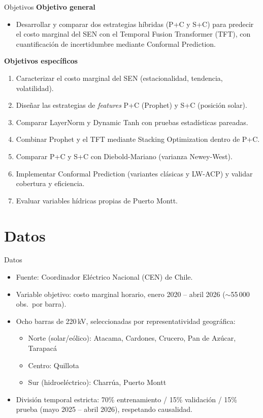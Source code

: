 \documentclass[aspectratio=169]{beamer}
\begin{document}
\begin{frame}{Objetivos}
    \textbf{Objetivo general}
    \begin{itemize}
        \item Desarrollar y comparar dos estrategias híbridas (P+C y S+C) para predecir el costo marginal del SEN con el Temporal Fusion Transformer (TFT), con cuantificación de incertidumbre mediante Conformal Prediction.
    \end{itemize}
    \vspace{0.5em}
    \textbf{Objetivos específicos}
    \begin{enumerate}
        \small
        \item Caracterizar el costo marginal del SEN (estacionalidad, tendencia, volatilidad).
        \item Diseñar las estrategias de \textit{features} P+C (Prophet) y S+C (posición solar).
        \item Comparar LayerNorm y Dynamic Tanh con pruebas estadísticas pareadas.
        \item Combinar Prophet y el TFT mediante Stacking Optimization dentro de P+C.
        \item Comparar P+C y S+C con Diebold-Mariano (varianza Newey-West).
        \item Implementar Conformal Prediction (variantes clásicas y LW-ACP) y validar cobertura y eficiencia.
        \item Evaluar variables hídricas propias de Puerto Montt.
    \end{enumerate}
\end{frame}

\section{Datos}

\begin{frame}{Datos}
    \begin{itemize}
        \item Fuente: Coordinador Eléctrico Nacional (CEN) de Chile.
        \item Variable objetivo: costo marginal horario, enero 2020 -- abril 2026 ($\sim$55\,000 obs.\ por barra).
        \item Ocho barras de 220\,kV, seleccionadas por representatividad geográfica:
        \begin{itemize}
            \item Norte (solar/eólico): Atacama, Cardones, Crucero, Pan de Azúcar, Tarapacá
            \item Centro: Quillota
            \item Sur (hidroeléctrico): Charrúa, Puerto Montt
        \end{itemize}
        \item División temporal estricta: 70\% entrenamiento / 15\% validación / 15\% prueba (mayo 2025 -- abril 2026), respetando causalidad.
    \end{itemize}
\end{frame}
\end{document}
